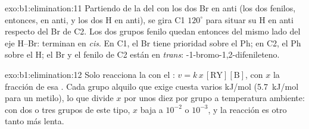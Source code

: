 \begin{solution}{exo:b1:elimination:11}
Partiendo de la  del  con los dos Br en anti
(los dos fenilos, entonces, en anti, y los dos H en anti), se gira C1
$120^\circ$ para situar su H en anti respecto del Br de C2. Los dos grupos
fenilo quedan entonces del mismo lado del eje H--Br: terminan en
\textit{cis}. En C1, el Br tiene prioridad sobre el Ph; en C2, el Ph sobre
el H; el Br y el fenilo de C2 están en \textit{trans}:
-1-bromo-1,2-difenileteno.
\end{solution}

\begin{solution}{exo:b1:elimination:12}
Solo reacciona la  con el  :
$v = k\,x\,[\mathrm{RY}][\mathrm{B}]$,
con $x$ la fracción de esa . Cada grupo alquilo  que exige
cuesta varios kJ/mol (\qty{5.7}{kJ/mol} para un metilo), lo que divide
$x$ por unos diez por grupo a temperatura ambiente: con dos o tres grupos
de este tipo, $x$ baja a $10^{-2}$ o $10^{-3}$, y la reacción es otro
tanto más lenta.
\end{solution}

